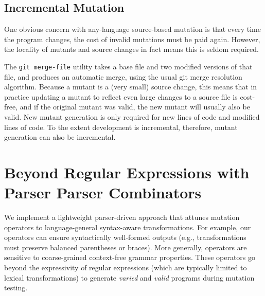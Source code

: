 \documentclass[sigconf,review, anonymous]{acmart}
\begin{document}
{\subsection{Incremental Mutation}

One obvious concern with any-language source-based mutation is that every time the
program changes, the cost of invalid mutations must be paid again.
However, the locality of mutants and source changes in fact means this
is seldom required.

The {\tt git merge-file} utility takes a base file and two modified
versions of that file, and produces an automatic merge, using the
usual git merge resolution algorithm.    Because a mutant is a (very
small) source change, this means that in practice updating a mutant to
reflect even large changes to a source file is cost-free, and if the
original mutant was valid, the new mutant will usually also be valid.
New mutant generation is only required for new lines of code and
modified lines of code.  To the extent development is incremental,
therefore, mutant generation can also be incremental.

\section{Beyond Regular Expressions with Parser Parser Combinators}

We implement a lightweight parser-driven approach that attunes mutation
operators to language-general syntax-aware transformations. For example, our
operators can ensure syntactically well-formed outputs (e.g., transformations
must preserve balanced parentheses or braces). More generally, operators are
sensitive to coarse-grained context-free grammar properties. These operators go
beyond the expressivity of regular expressions (which are typically limited to
lexical transformations) to generate \emph{varied} and \emph{valid}
programs during mutation testing.

}
\end{document}
